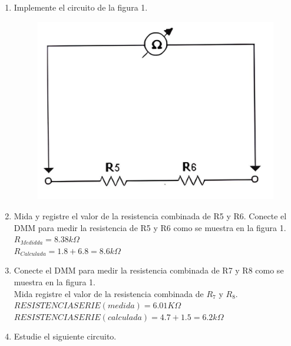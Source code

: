 \begin{enumerate}
\begin{table}[h]
	\end{table}
	\item Implemente el circuito de la figura 1.
	\begin{figure}[h]
		\centering
		\includegraphics[scale=0.3]{imagenes/1}
	\end{figure}
	\item Mida y registre el valor de la resistencia combinada de R5 y R6.
	Conecte el DMM para medir la resistencia de R5 y R6 como se muestra en la figura 1.\\
	$R_{Medidda} = 8.38 k\Omega $\\
	$R_{Calculada} = 1.8 + 6.8 = 8.6 k\Omega$
	\item Conecte el DMM para medir la resistencia combinada de R7 y R8 como se muestra en la figura 1.\\
	Mida registre el valor de la resistencia combinada de $R_{7}$ y $R_{8}$. 
	$RESISTENCIA SERIE (medida) = 6.01 K\Omega$\\
	$RESISTENCIA SERIE (calculada) = 4.7 + 1.5 = 6.2 k\Omega$
	\item Estudie el siguiente circuito.
	\\
	\\
	\\
	\begin{figure}[h]
		\centering

\end{figure}
\end{enumerate}
